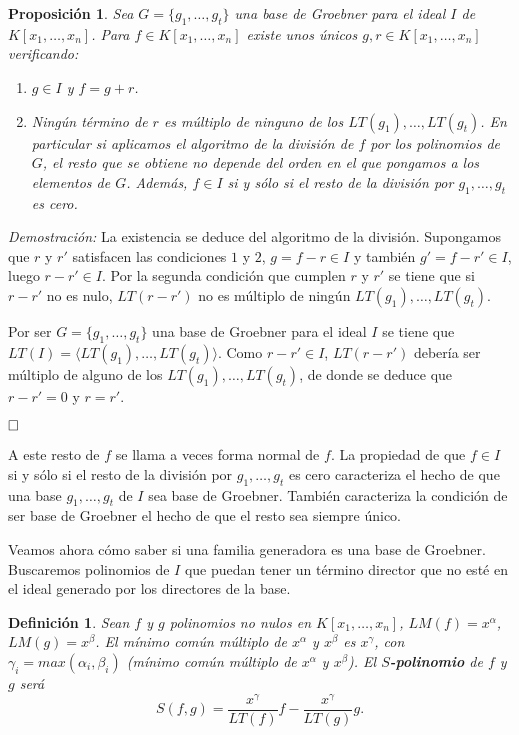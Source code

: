 \documentclass[12pt]{article}
\newtheorem{proposition}[theorem]{Proposición}
\newtheorem{definition}[theorem]{Definición}
\begin{document}
\begin{proposition}Sea $G = \lbrace g_1, \ldots, g_t \rbrace$ una base de Groebner para el ideal $I$ de $K[x_1, \ldots, x_n]$. Para $f \in K[x_1, \ldots, x_n]$ existe unos únicos $g,r \in K[x_1, \ldots, x_n]$ verificando:
\begin{enumerate}
\item $g\in I$ y $f=g+r$.
\item Ningún término de $r$ es múltiplo de ninguno de los $LT(g_1), \ldots, LT(g_t)$. En particular si aplicamos el algoritmo de la división de $f$ por los polinomios de $G$, el resto que se obtiene no depende del orden en el que pongamos a los elementos de $G$. Además, $f \in I$ si y sólo si el resto de la división por $g_1, \ldots, g_t$ es cero.
\end{enumerate}
\end{proposition}
\emph{Demostración: }La existencia se deduce del algoritmo de la división. Supongamos que $r$ y $r'$ satisfacen las condiciones $1$ y $2$, $g = f-r \in I$ y también $g' = f -r' \in I$, luego $r-r' \in I$. Por la segunda condición que cumplen $r$ y $r'$ se tiene que si $r-r'$ no es nulo, $LT(r-r')$ no es múltiplo de ningún $LT(g_1), \ldots, LT(g_t)$. 

Por ser $G = \lbrace g_1, \ldots, g_t \rbrace$ una base de Groebner para el ideal $I$ se tiene que $LT(I) = \langle LT(g_1), \ldots, LT(g_t) \rangle$. Como $r-r' \in I$, $LT(r-r')$ debería ser múltiplo de alguno de los $LT(g_1), \ldots, LT(g_t)$, de donde se deduce que $r-r'=0$ y $r=r'$.

$\hfill \square$

A este resto de $f$ se llama a veces forma normal de $f$. La propiedad de que $f \in I$ si y sólo si el resto de la división por $g_1, \ldots, g_t$ es cero caracteriza el hecho de que una base $g_1, \ldots, g_t$ de $I$ sea base de Groebner. También caracteriza la condición de ser base de Groebner el hecho de que el resto sea siempre único.

Veamos ahora cómo saber si una familia generadora es una base de Groebner. Buscaremos polinomios de $I$ que puedan tener un término director que no esté en el ideal generado por los directores de la base.

\begin{definition}Sean $f$ y $g$ polinomios no nulos en $K[x_1, \ldots, x_n]$, $LM(f) = x^\alpha$, $LM(g) = x^\beta$. El mínimo común múltiplo de $x^\alpha$ y $x^\beta$ es $x^\gamma$, con $\gamma_i = max(\alpha_i, \beta_i)$ (mínimo común múltiplo de $x^\alpha$ y $x^\beta$). El \textbf{$S$-polinomio} de $f$ y $g$ será $$S(f,g) = \dfrac{x^\gamma}{LT(f)}f-\dfrac{x^\gamma}{LT(g)}g.$$
\end{definition}
\end{document}
